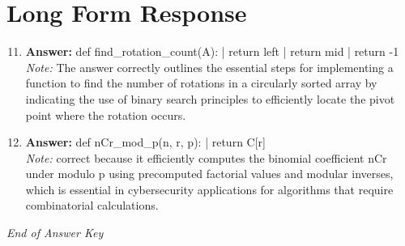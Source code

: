 \documentclass[12pt]{article}
\begin{document}
\section*{Long Form Response}
\begin{enumerate}[label=\arabic*.]
\setcounter{enumi}{10}
\item \textbf{Answer:} def find\_rotation\_count(A): | return left | return mid | return -1
\\ \textit{Note:} The answer correctly outlines the essential steps for implementing a function to find the number of rotations in a circularly sorted array by indicating the use of binary search principles to efficiently locate the pivot point where the rotation occurs.
\item \textbf{Answer:} def nCr\_mod\_p(n, r, p): | return C[r]
\\ \textit{Note:} correct because it efficiently computes the binomial coefficient nCr under modulo p using precomputed factorial values and modular inverses, which is essential in cybersecurity applications for algorithms that require combinatorial calculations.
\end{enumerate}

\vfill
\noindent\textit{End of Answer Key}
\end{document}
